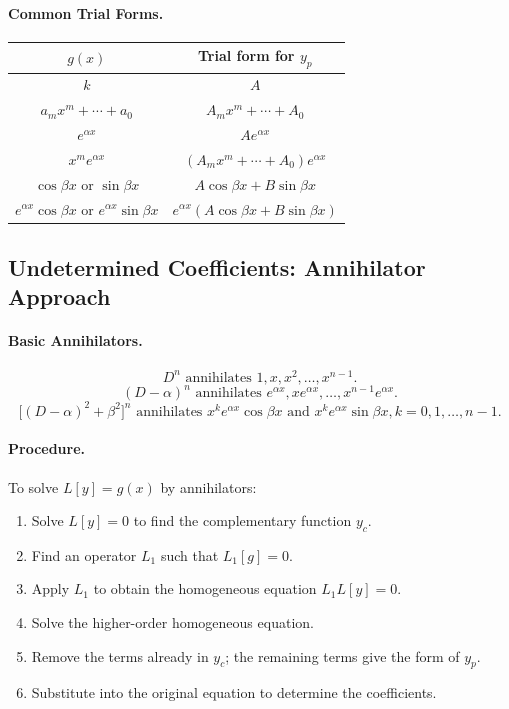 \documentclass[oneside]{book}
\begin{document}
\paragraph{Common Trial Forms.}
\begin{center}
\begin{tabular}{c|c}
$g(x)$ & Trial form for $y_p$\\
\hline
$k$ & $A$\\[0.2em]
$a_mx^m+\cdots+a_0$ & $A_mx^m+\cdots+A_0$\\[0.2em]
$e^{\alpha x}$ & $Ae^{\alpha x}$\\[0.2em]
$x^me^{\alpha x}$ & $(A_mx^m+\cdots+A_0)e^{\alpha x}$\\[0.2em]
$\cos \beta x$ or $\sin \beta x$ & $A\cos \beta x+B\sin \beta x$\\[0.2em]
$e^{\alpha x}\cos \beta x$ or $e^{\alpha x}\sin \beta x$ &
$e^{\alpha x}(A\cos \beta x+B\sin \beta x)$
\end{tabular}
\end{center}


\subsection{Undetermined Coefficients: Annihilator Approach}


\paragraph{Basic Annihilators.}
\[
    D^n \text{ annihilates } 1,x,x^2,\ldots,x^{n-1}.
\]
\[
    (D-\alpha)^n \text{ annihilates }
    e^{\alpha x},xe^{\alpha x},\ldots,x^{n-1}e^{\alpha x}.
\]
\[
    \bigl[(D-\alpha)^2+\beta^2\bigr]^n
    \text{ annihilates }
    x^ke^{\alpha x}\cos\beta x
    \text{ and }
    x^ke^{\alpha x}\sin\beta x, k=0,1,\ldots,n-1.
\]

\paragraph{Procedure.}
To solve $L[y]=g(x)$ by annihilators:
\begin{enumerate}
    \item Solve $L[y]=0$ to find the complementary function $y_c$.
    \item Find an operator $L_1$ such that $L_1[g]=0$.
    \item Apply $L_1$ to obtain the homogeneous equation $L_1L[y]=0$. 
    \item Solve the higher-order homogeneous equation.
    \item Remove the terms already in $y_c$; the remaining terms give the form of $y_p$.
    \item Substitute into the original equation to determine the coefficients.
\end{enumerate}
\end{document}
